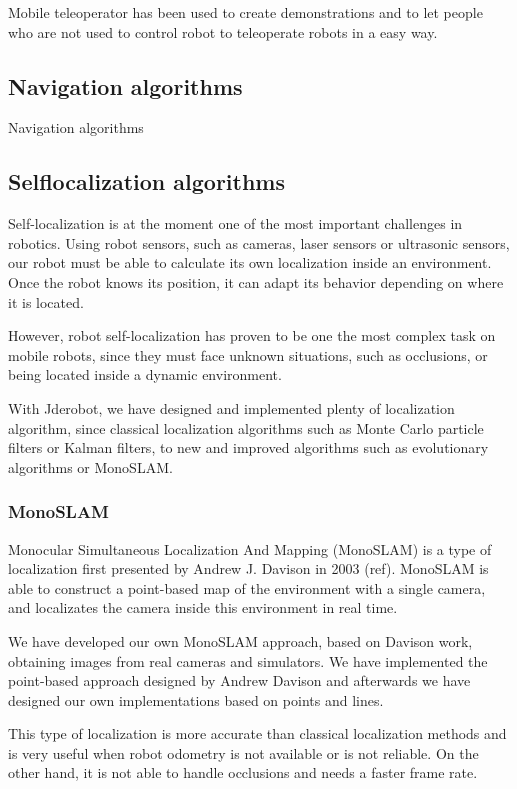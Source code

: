\documentclass[twocolumn]{svjour3}          %
\begin{document}
Mobile teleoperator has been used to create demonstrations and to let people who are not used to control robot to teleoperate robots in a easy way.

\subsection{Navigation algorithms}
Navigation algorithms
\subsection{Selflocalization algorithms}

Self-localization is at the moment one of the most important challenges in robotics. Using robot sensors, such as cameras, laser sensors or ultrasonic sensors, our robot must be able to calculate its own localization inside an environment. Once the robot knows its position, it can adapt its behavior depending on where it is located. 
 
However, robot self-localization has proven to be one the most complex task on mobile robots, since they must face unknown situations, such as occlusions, or being located inside a dynamic environment.

With Jderobot, we have designed and implemented plenty of localization algorithm, since classical localization algorithms such as Monte Carlo particle filters or Kalman filters, to new and improved algorithms such as evolutionary algorithms or MonoSLAM.

\subsubsection{MonoSLAM}

Monocular Simultaneous Localization And Mapping (MonoSLAM) is a type of localization first presented by Andrew J. Davison in 2003 (ref). MonoSLAM is able to construct a point-based map of the environment with a single camera, and localizates the camera inside this environment in real time.

We have developed our own MonoSLAM approach, based on Davison work, obtaining images from real cameras and simulators. We have implemented the point-based approach designed by Andrew Davison and afterwards we have designed our own implementations based on points and lines.

This type of localization is more accurate than classical localization methods and is very useful when robot odometry is not available or is not reliable. On the other hand, it is not able to handle occlusions and needs a faster frame rate.
\end{document}
